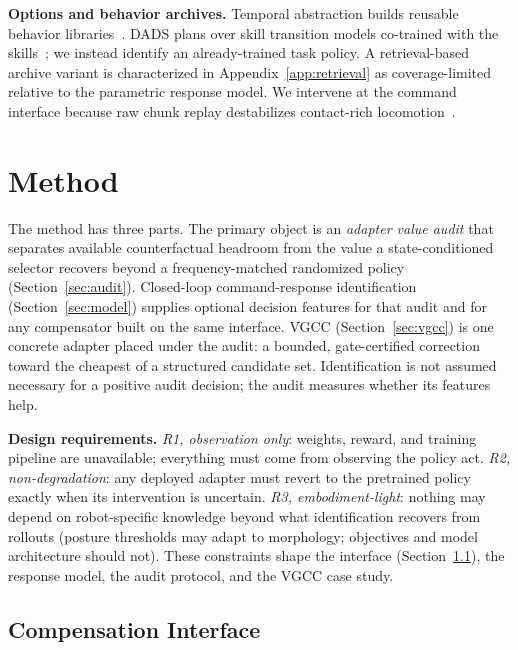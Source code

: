 \documentclass{article}
\begin{document}
\textbf{Options and behavior archives.}
Temporal abstraction builds reusable behavior
libraries~\citep{sutton1999options,bacon2017option,eysenbach2019diversity,sharma2020dynamics,peng2022ase,mouret2015illuminating}.
DADS plans over skill transition models co-trained with the
skills~\citep{sharma2020dynamics}; we instead identify an already-trained task
policy. A retrieval-based archive variant is characterized in
Appendix~\ref{app:retrieval} as coverage-limited relative to the parametric
response model. We intervene at the command interface because raw chunk replay
destabilizes contact-rich locomotion~\citep{zhao2023learning}.

\section{Method}
\label{sec:method}

The method has three parts. The primary object is an \emph{adapter value audit}
that separates available counterfactual headroom from the value a
state-conditioned selector recovers beyond a frequency-matched randomized policy
(Section~\ref{sec:audit}). Closed-loop command-response identification
(Section~\ref{sec:model}) supplies optional decision features for that audit and
for any compensator built on the same interface. VGCC
(Section~\ref{sec:vgcc}) is one concrete adapter placed under the audit: a bounded, gate-certified correction toward the cheapest of a structured candidate set. Identification is not assumed necessary for a positive audit decision; the audit measures whether its features help.

\textbf{Design requirements.}
\emph{R1, observation only}: weights, reward, and training pipeline are
unavailable; everything must come from observing the policy act.
\emph{R2, non-degradation}: any deployed adapter must revert to the pretrained
policy exactly when its intervention is uncertain.
\emph{R3, embodiment-light}: nothing may depend on robot-specific knowledge
beyond what identification recovers from rollouts (posture thresholds may adapt
to morphology; objectives and model architecture should not).
These constraints shape the interface (Section~\ref{sec:setting}), the response
model, the audit protocol, and the VGCC case study.

\subsection{Compensation Interface}
\label{sec:setting}
\end{document}
